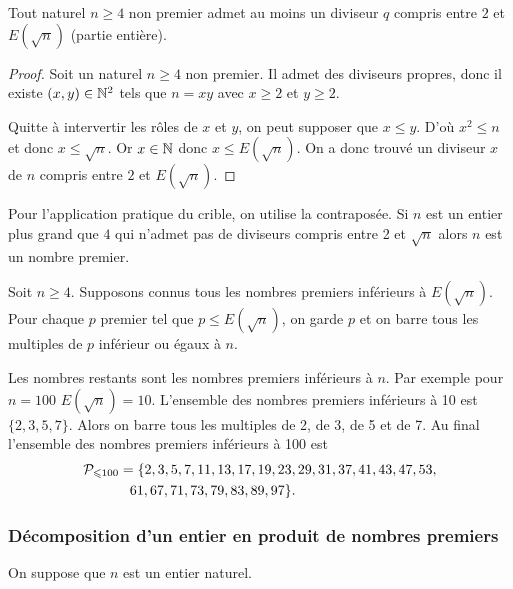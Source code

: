 \begin{prop}
  Tout naturel \(n \geqslant 4\) non premier admet au moins un diviseur \(q\) compris entre \(2\) et \(E(\sqrt{n})\) (partie entière).
\end{prop}
\begin{proof}
  Soit un naturel \(n \geqslant 4\) non  premier. Il admet des diviseurs propres, donc il existe \((x,y) \in \N^2\) tels que \(n=xy\) avec \(x \geqslant 2\) et \(y \geqslant 2\).

  Quitte à intervertir les rôles de \(x\) et \(y\), on peut supposer que \(x \leqslant y\). D'où \(x^2 \leqslant n\) et donc \(x \leqslant \sqrt{n}\). Or \(x \in \N\) donc \(x \leqslant E(\sqrt{n})\). On a donc trouvé un diviseur \(x\) de \(n\) compris entre \(2\) et \(E(\sqrt{n})\).
\end{proof}

Pour l'application pratique du crible, on utilise la contraposée. Si \(n\) est un entier plus grand que \(4\) qui n'admet pas de diviseurs compris entre 2 et \(\sqrt{n}\) alors \(n\) est un nombre premier.

Soit \(n \geqslant 4\). Supposons connus tous les nombres premiers inférieurs à \(E(\sqrt{n})\). Pour chaque \(p\) premier tel que \(p \leqslant E(\sqrt{n})\), on garde \(p\) et on barre tous les multiples de \(p\) inférieur ou égaux à \(n\).

Les nombres restants sont les nombres premiers inférieurs à \(n\). Par exemple pour \(n=100\) \(E(\sqrt{n})=10\). L'ensemble des nombres premiers inférieurs à 10 est \(\{2,3,5,7\}\). Alors on barre tous les multiples de 2, de 3, de 5 et de 7. Au final l'ensemble des nombres premiers inférieurs à 100 est 
\begin{align}
\P_{\leqslant 100}&=\{2,3,5,7,11,13,17,19,23,29,31,37,41,43,47,53, \notag \\
& \phantom{=} 61,67,71,73,79,83,89,97\}.
\end{align}

\subsubsection{Décomposition d'un entier en produit de nombres premiers}

On suppose que \(n\) est un entier naturel.

